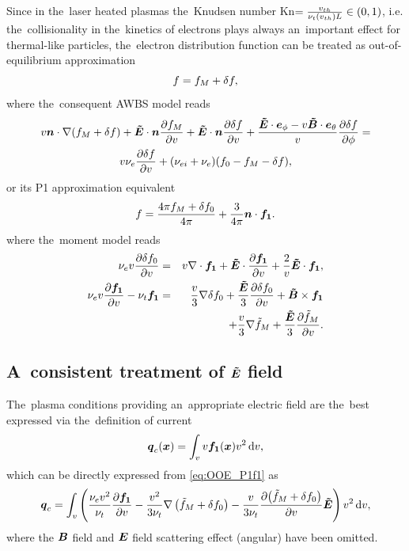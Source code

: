 \documentclass[preprint,12pt]{elsarticle}
\newcounter{bla}
\begin{document}
Since in the~laser heated plasmas the~Knudsen number 
Kn$ = \frac{v_{th}}{\nu_t(v_{th}) L} \in (0, 1)$, i.e. the~collisionality in 
the~kinetics of electrons plays always an~important effect for thermal-like 
particles, the~electron distribution 
function can be treated as out-of-equilibrium approximation 
\begin{equation}
  f = f_M + \delta f ,
  \label{eq:OOE_outofeq}
\end{equation}  
where the~consequent AWBS model reads
\begin{multline}
  v\boldsymbol{n}\cdot\nabla (f_M + \delta f) + \boldsymbol{\tilde{E}}\cdot\boldsymbol{n} \frac{\partial{f_M}}{\partial{v}} 
  + \boldsymbol{\tilde{E}}\cdot\boldsymbol{n} \frac{\partial{\delta f}}{\partial{v}} 
  + \frac{\boldsymbol{\tilde{E}}\cdot\boldsymbol{e}_\phi 
  - v\boldsymbol{\tilde{B}}\cdot\boldsymbol{e}_\theta}{v}\frac{\partial{\delta f}}{\partial{\phi}}
  = \\
  v \nu_{e} \frac{\partial{\delta f}}{\partial{v}} 
  + (\nu_{ei} + \nu_{e}) (f_0 - f_M - \delta f) ,
  \label{eq:OOE_AWBS_model}
\end{multline}
or its P1 approximation equivalent
\begin{equation}
  f = \frac{4\pi f_M + \delta f_0}{4\pi} + \frac{3}{4\pi}\boldsymbol{n}\cdot\boldsymbol{f_1} .
  \label{eq:OOE_P1outofeq}
\end{equation}
where the~moment model reads
\begin{eqnarray}
  \nu_{e}v\frac{\partial{\delta f_0}}{\partial{v}} &=&
  v\nabla\cdot\boldsymbol{f_1} + \boldsymbol{\tilde{E}}\cdot
  \frac{\partial{\boldsymbol{f_1}}}{\partial{v}} + \frac{2}{v}\boldsymbol{\tilde{E}}\cdot\boldsymbol{f_1} , 
  \label{eq:OOE_P1f0}\\
  \nu_{e}v\frac{\partial{\boldsymbol{f_1}}}{\partial{v}} - \nu_{t}\boldsymbol{f_1} &=& 
  \frac{v}{3}\nabla\delta f_0 + 
  \frac{\boldsymbol{\tilde{E}}}{3}\frac{\partial{\delta f_0}}{\partial{v}} + \boldsymbol{\tilde{B}}\times\boldsymbol{f_1} 
  \nonumber \\
  & & + \frac{v}{3}\nabla\tilde{f}_M + \frac{\boldsymbol{\tilde{E}}}{3}\frac{\partial{\tilde{f}_M}}{\partial{v}} .
  \label{eq:OOE_P1f1}
\end{eqnarray}

\subsection{A~consistent treatment of $\boldsymbol{\tilde{E}}$ field}
\label{sec:OOE_E_treatment}
The~plasma conditions providing an~appropriate electric field
are the~best expressed via the~definition of current
\begin{equation}
  \boldsymbol{q}_c(\boldsymbol{x}) = \int_{v}
  v\boldsymbol{f_1}(\boldsymbol{x}) v^2\, \text{d}v , 
  \nonumber 
\end{equation}
which can be directly expressed from \eqref{eq:OOE_P1f1} as
\begin{equation}
  \boldsymbol{q}_c =
  \int_{v} \left(\frac{\nu_{e}v^2}{\nu_{t}}\frac{\partial{\boldsymbol{f_1}}}{\partial{v}}
  - \frac{v^2}{3\nu_{t}}\nabla\left(\tilde{f}_M + \delta f_0\right) - 
  \frac{v}{3\nu_{t}}\frac{\partial{\left(\tilde{f}_M+ \delta f_0\right)}}{\partial{v}}\boldsymbol{\tilde{E}}
  \right) v^2\, \text{d}v ,
  \label{eq:OOE_P1current}
\end{equation}
where the $\boldsymbol{B}$ field and $\boldsymbol{E}$ field scattering effect (angular) have been 
omitted.  
\end{document}
